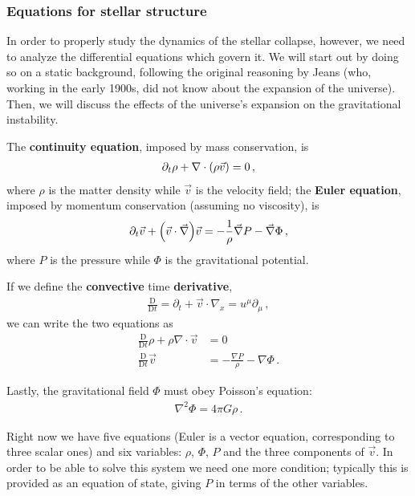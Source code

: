 \documentclass[main.tex]{subfiles}
\begin{document}

\subsubsection{Equations for stellar structure}

In order to properly study the dynamics of the stellar collapse, however, we need to analyze the differential equations which govern it. 
We will start out by doing so on a static background, following the original reasoning by Jeans (who, working in the early 1900s, did not know about the expansion of the universe). Then, we will discuss the effects of the universe's expansion on the gravitational instability. 

The \textbf{continuity equation}, imposed by mass conservation, is
%
\begin{align}
  \partial_{t} \rho + \nabla \cdot \qty(\rho \vec{v}) = 0
\,,
\end{align}
%
where \(\rho \) is the matter density while \(\vec{v}\) is the velocity field; the \textbf{Euler equation}, imposed by momentum conservation (assuming no viscosity), is 
%
\begin{align}
  \partial_{t} \vec{v} + \qty(\vec{v} \cdot \vec{\nabla}) \vec{v}
  = - \frac{1}{\rho } \vec{\nabla} P - \vec{\nabla} \Phi 
\,,
\end{align}
%
where \(P\) is the pressure while \(\Phi \) is the gravitational potential.

If we define the \textbf{convective} time \textbf{derivative},  
%
\begin{align}
  \frac{ \mathrm{D} }{\mathrm{D}t} = \partial_{t} + \vec{v} \cdot \nabla_{x} = u^{\mu } \partial_{\mu }
\,,
\end{align}
%
we can write the two equations as 
%
\begin{align}
  \frac{ \mathrm{D} }{\mathrm{D}t} \rho + \rho \nabla \cdot \vec{v} &= 0 \\
  \frac{ \mathrm{D} }{\mathrm{D}t} \vec{v} 
  &= - \frac{\nabla P}{\rho } - \nabla \Phi 
\,.
\end{align}

Lastly, the gravitational field \(\Phi \) must obey Poisson's equation:
%
\begin{align}
  \nabla^2 \Phi = 4 \pi G \rho 
\,.
\end{align}

Right now we have five equations (Euler is a vector equation, corresponding to three scalar ones) and six variables: \(\rho \), \(\Phi \), \(P\) and the three components of \(\vec{v}\). 
In order to be able to solve this system we need one more condition; typically this is provided as an equation of state, giving \(P\) in terms of the other variables. 
\end{document}
